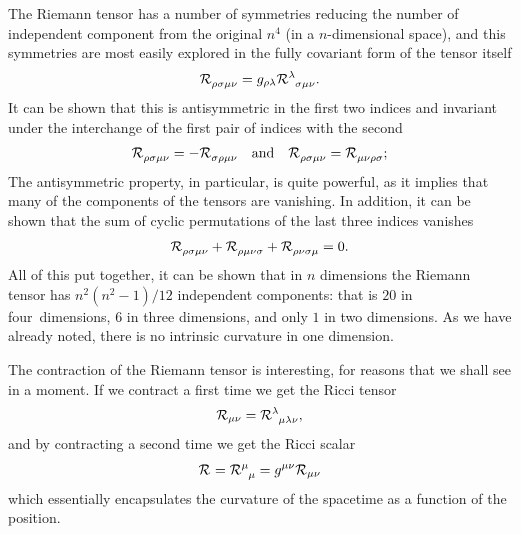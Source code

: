 The Riemann tensor has a number of symmetries reducing the number of independent
component from the original $n^4$ (in a $n$-dimensional space), and this symmetries
are most easily explored in the fully covariant form of the tensor itself
\begin{align*}
  \riemann{}{\rho\sigma\mu\nu} = g_{\rho\lambda}\riemann{\lambda}{\sigma\mu\nu}.
\end{align*}
It can be shown that this is antisymmetric in the first two indices and
invariant under the interchange of the first pair of indices with the second
\begin{align*}
  \riemann{}{\rho\sigma\mu\nu} = -\riemann{}{\sigma\rho\mu\nu}
  \quad \text{and} \quad
  \riemann{}{\rho\sigma\mu\nu} = \riemann{}{\mu\nu\rho\sigma};
\end{align*}
The antisymmetric property, in particular, is quite powerful, as it implies that
many of the components of the tensors are vanishing.
In addition, it can be shown that the sum of cyclic permutations of the last three
indices vanishes
\begin{align*}
  \riemann{}{\rho\sigma\mu\nu} + \riemann{}{\rho\mu\nu\sigma} + \riemann{}{\rho\nu\sigma\mu} = 0.
\end{align*}
All of this put together, it can be shown that in $n$ dimensions the Riemann tensor
has $n^2 (n^2 - 1) / 12$ independent components: that is $20$ in four~dimensions,
$6$ in three dimensions, and only $1$ in two dimensions. As we have already noted,
there is no intrinsic curvature in one dimension.

The contraction of the Riemann tensor is interesting, for reasons that we shall see
in a moment. If we contract a first time we get the Ricci tensor
\begin{align}\label{eq:ricci_tensor}
  \ricci{\mu\nu} = \riemann{\lambda}{\mu\lambda\nu},
\end{align}
and by contracting a second time we get the Ricci scalar
\begin{align}\label{eq:ricci_scalar}
  \mathcal{R}_{} = \mathcal{R}^\mu_{\phantom{\mu}\mu} = g^{\mu\nu} \mathcal{R}_{\mu\nu}
\end{align}
which essentially encapsulates the curvature of the spacetime as a function of the
position.


